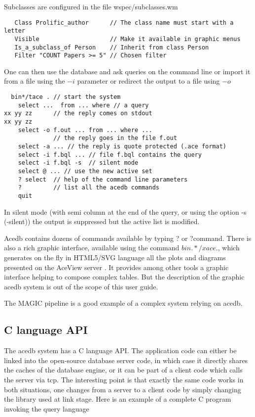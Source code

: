 \documentclass[11pt]{article}
\newcommand{\BL}{\begin{lstlisting}}
\begin{document}
Subclasses are configured in the file wspec/subclasses.wm

\BL
   Class Prolific_author      // The class name must start with a letter
   Visible                    // Make it available in graphic menus
   Is_a_subclass_of Person    // Inherit from class Person
   Filter "COUNT Papers >= 5" // Chosen filter
\end{lstlisting}

One can then use the database and ask queries on the command
line or import it from a file using the $-$$i$ parameter
or redirect the output to a file using $-$$o$
\BL
  bin*/tace . // start the system
    select ...  from ... where // a query
xx yy zz      // the reply comes on stdout
xx yy zz
    select -o f.out ... from ... where ...
              // the reply goes in the file f.out
    select -a ... // the reply is quote protected (.ace format)
    select -i f.bql ... // file f.bql contains the query
    select -i f.bql -s  // silent mode
    select @ ... // use the new active set 
    ? select  // help of the command line parameters
    ?         // list all the acedb commands
    quit
\end{lstlisting}
In silent mode (with semi column at the end of the query, or using
the option -s (-silent)) the output is suppressed but the
active list is modified.

Acedb contains dozens of commands available by typing ? or ?command.
There is also a rich graphic interface, available using the
command $bin.*/xace .$, which generates on the fly in HTML5/SVG language
all the plots and diagrams presented on the AceView server \cite{[3]}.
It provides among other tools
a graphic interface helping to compose complex tables.
But the description of the graphic acedb system is out of the scope of this 
user guide.

The MAGIC pipeline  \cite{[4]} is a good example of a complex system 
relying on acedb.



\subsection{C language API}

The acedb system has a C language API. The application code
can either be linked into the open-source database server code,
in which case it directly shares the caches of the database engine,
or it can be part of a client code which calls the server
via tcp. The interesting point is that exactly the same code
works in both situations, one changes from a server to a client
code by simply changing the library used at link stage.
Here is an example of a complete C program invoking the query language  
\end{document}
